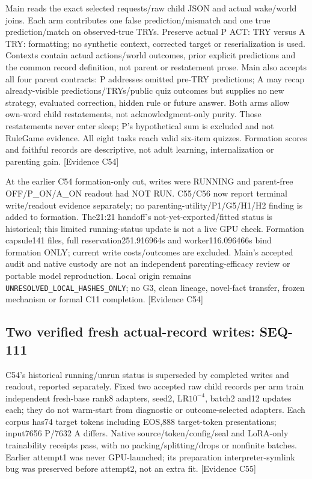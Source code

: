 \documentclass[11pt]{article}
\newcommand{\ev}[1]{\textsf{[Evidence #1]}}
\begin{document}
Main reads the exact selected requests/raw child JSON and actual wake/world
joins. Each arm contributes one false prediction/mismatch and one true
prediction/match on observed-true TRYs. Preserve actual P ACT: TRY versus A TRY:
formatting; no synthetic context, corrected target or reserialization is used.
Contexts contain actual actions/world outcomes, prior explicit predictions and
the common record definition, not parent or restatement prose. Main also accepts
all four parent contracts: P addresses omitted pre-TRY predictions; A may recap
already-visible predictions/TRYs/public quiz outcomes but supplies no new
strategy, evaluated correction, hidden rule or future answer. Both arms allow
own-word child restatements, not acknowledgment-only purity. Those restatements
never enter sleep; P's hypothetical sum is excluded and not RuleGame evidence.
All eight tasks reach valid six-item quizzes. Formation scores and faithful
records are descriptive, not adult learning, internalization or parenting gain.
\ev{C54}

At the earlier C54 formation-only cut, writes were RUNNING and parent-free
OFF/P\_ON/A\_ON readout had NOT RUN. C55/C56 now report terminal write/readout
evidence separately; no parenting-utility/P1/G5/H1/H2 finding is added to formation.
The21:21 handoff's not-yet-exported/fitted status is historical; this limited
running-status update is not a live GPU check. Formation capsule141 files,
full reservation251.916964s and worker116.096466s bind formation ONLY; current
write costs/outcomes are excluded. Main's accepted audit and native custody
are not an independent parenting-efficacy review or portable model reproduction.
Local origin remains \texttt{UNRESOLVED\_LOCAL\_HASHES\_ONLY}; no G3,
clean lineage, novel-fact transfer, frozen mechanism or formal C11 completion.
\ev{C54}

\subsection{Two verified fresh actual-record writes: SEQ-111}
C54's historical running/unrun status is superseded by completed writes and
readout, reported separately. Fixed two accepted raw child records per arm
train independent fresh-base rank8 adapters, seed2, LR$10^{-4}$, batch2 and12
updates each; they do not warm-start from diagnostic or outcome-selected
adapters. Each corpus has74 target tokens including EOS,888 target-token
presentations; input7656 P/7632 A differs. Native source/token/config/seal and
LoRA-only trainability receipts pass, with no packing/splitting/drops or
nonfinite batches. Earlier attempt1 was never GPU-launched; its preparation
interpreter-symlink bug was preserved before attempt2, not an extra fit. \ev{C55}
\end{document}
